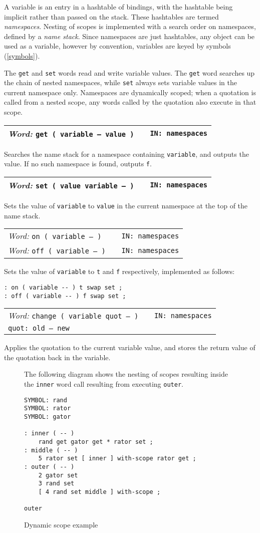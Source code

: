\documentclass{report}
\newcommand{\ordinaryword}[3]{\index{#1}
\emph{Word:} \texttt{#2} &&\texttt{IN: #3}}
\newcommand{\wordtable}[1]{

\begin{tabularx}{12cm}[t]{lXr}
\hline
#1\\
\hline
\end{tabularx}

}
\begin{document}
A variable is an entry in a hashtable of bindings, with the hashtable being implicit rather than passed on the stack. These hashtables are termed \emph{namespaces}. Nesting of scopes is implemented with a search order on namespaces, defined by a \emph{name stack}. Since namespaces are just hashtables, any object can be used as a variable, however by convention, variables are keyed by symbols (\ref{symbols}). 

The \texttt{get} and \texttt{set} words read and write variable values. The \texttt{get} word searches up the chain of nested namespaces, while \texttt{set} always sets variable values in the current namespace only. Namespaces are dynamically scoped; when a quotation is called from a nested scope, any words called by the quotation also execute in that scope.

\wordtable{
\ordinaryword{get}{get ( variable -- value )}{namespaces}
}
Searches the name stack for a namespace containing \texttt{variable}, and outputs the value. If no such namespace is found, outputs \texttt{f}.
\wordtable{
\ordinaryword{set}{set ( value variable -- )}{namespaces}
}
Sets the value of \texttt{variable} to \texttt{value} in the current namespace at the top of the name stack.
\wordtable{
\ordinaryword{on}{on ( variable -- )}{namespaces}\\
\ordinaryword{off}{off ( variable -- )}{namespaces}
}
Sets the value of \texttt{variable} to \texttt{t} and \texttt{f} respectively, implemented as follows:
\begin{verbatim}
: on ( variable -- ) t swap set ;
: off ( variable -- ) f swap set ;
\end{verbatim}
\wordtable{
\ordinaryword{change}{change ( variable quot -- )}{namespaces}\\
\texttt{quot:~old -- new}
}
Applies the quotation to the current variable value, and stores the return value of the quotation back in the variable.
\begin{figure}
\caption{Dynamic scope example}
The following diagram shows the nesting of scopes resulting inside the \texttt{inner} word call resulting from executing \texttt{outer}.
\begin{verbatim}
SYMBOL: rand
SYMBOL: rator
SYMBOL: gator

: inner ( -- )
    rand get gator get * rator set ;
: middle ( -- )
    5 rator set [ inner ] with-scope rator get ;
: outer ( -- )
    2 gator set
    3 rand set
    [ 4 rand set middle ] with-scope ;

outer
\end{verbatim}
\begin{center}
\end{center}
\end{figure}
\end{document}
